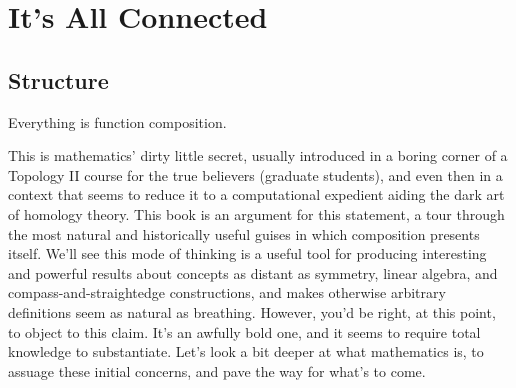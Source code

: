 \chapter{It's All Connected}

\section{Structure}

Everything is function composition.

This is mathematics' dirty little secret, usually introduced in a boring corner of a Topology II course
for the true believers (graduate students), and even then in a context that seems to reduce it
to a computational expedient aiding the dark art of homology theory.
This book is an argument for this statement, a tour through the most natural and historically useful guises in which composition presents itself.
We'll see this mode of thinking is a useful tool for producing interesting and powerful results about concepts as distant as
symmetry, linear algebra, and compass-and-straightedge constructions, and makes otherwise arbitrary definitions seem as natural as breathing.
However, you'd be right, at this point, to object to this claim.
It's an awfully bold one, and it seems to require total knowledge to substantiate.
Let's look a bit deeper at what mathematics is, to assuage these initial concerns, and pave the way for what's to come.

